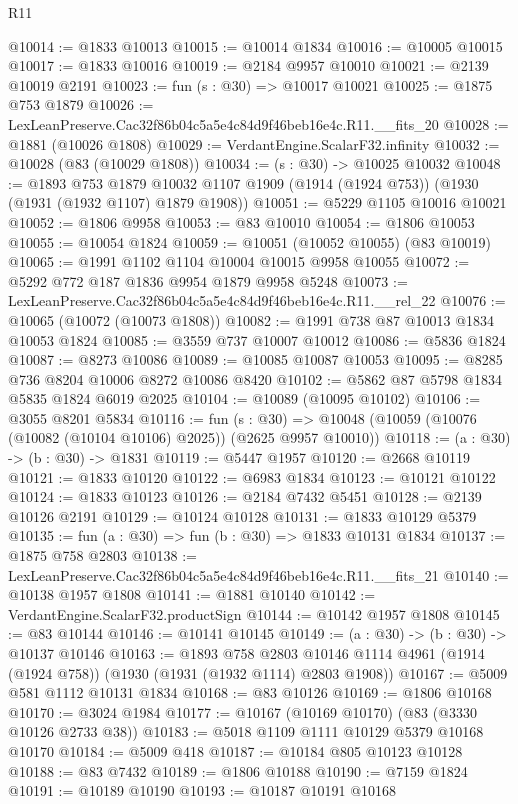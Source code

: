 \begin{lexlean}{R11}
\begin{coremodule}
@10014 := @1833 @10013
@10015 := @10014 @1834
@10016 := @10005 @10015
@10017 := @1833 @10016
@10019 := @2184 @9957 @10010
@10021 := @2139 @10019 @2191
@10023 := fun (s : @30) => @10017 @10021
@10025 := @1875 @753 @1879
@10026 := LexLeanPreserve.Cac32f86b04c5a5e4c84d9f46beb16e4c.R11.__fits_20
@10028 := @1881 (@10026 @1808)
@10029 := VerdantEngine.ScalarF32.infinity
@10032 := @10028 (@83 (@10029 @1808))
@10034 := (s : @30) -> @10025 @10032
@10048 := @1893
    @753
    @1879
    @10032
    @1107
    @1909
    (@1914 (@1924 @753))
    (@1930 (@1931 (@1932 @1107) @1879 @1908))
@10051 := @5229 @1105 @10016 @10021
@10052 := @1806 @9958
@10053 := @83 @10010
@10054 := @1806 @10053
@10055 := @10054 @1824
@10059 := @10051 (@10052 @10055) (@83 @10019)
@10065 := @1991 @1102 @1104 @10004 @10015 @9958 @10055
@10072 := @5292 @772 @187 @1836 @9954 @1879 @9958 @5248
@10073 := LexLeanPreserve.Cac32f86b04c5a5e4c84d9f46beb16e4c.R11.__rel_22
@10076 := @10065 (@10072 (@10073 @1808))
@10082 := @1991 @738 @87 @10013 @1834 @10053 @1824
@10085 := @3559 @737 @10007 @10012
@10086 := @5836 @1824
@10087 := @8273 @10086
@10089 := @10085 @10087 @10053
@10095 := @8285 @736 @8204 @10006 @8272 @10086 @8420
@10102 := @5862 @87 @5798 @1834 @5835 @1824 @6019 @2025
@10104 := @10089 (@10095 @10102)
@10106 := @3055 @8201 @5834
@10116 := fun (s : @30) =>
  @10048 (@10059 (@10076 (@10082 (@10104 @10106) @2025)) (@2625 @9957 @10010))
@10118 := (a : @30) -> (b : @30) -> @1831
@10119 := @5447 @1957
@10120 := @2668 @10119
@10121 := @1833 @10120
@10122 := @6983 @1834
@10123 := @10121 @10122
@10124 := @1833 @10123
@10126 := @2184 @7432 @5451
@10128 := @2139 @10126 @2191
@10129 := @10124 @10128
@10131 := @1833 @10129 @5379
@10135 := fun (a : @30) => fun (b : @30) => @1833 @10131 @1834
@10137 := @1875 @758 @2803
@10138 := LexLeanPreserve.Cac32f86b04c5a5e4c84d9f46beb16e4c.R11.__fits_21
@10140 := @10138 @1957 @1808
@10141 := @1881 @10140
@10142 := VerdantEngine.ScalarF32.productSign
@10144 := @10142 @1957 @1808
@10145 := @83 @10144
@10146 := @10141 @10145
@10149 := (a : @30) -> (b : @30) -> @10137 @10146
@10163 := @1893
    @758
    @2803
    @10146
    @1114
    @4961
    (@1914 (@1924 @758))
    (@1930 (@1931 (@1932 @1114) @2803 @1908))
@10167 := @5009 @581 @1112 @10131 @1834
@10168 := @83 @10126
@10169 := @1806 @10168
@10170 := @3024 @1984
@10177 := @10167 (@10169 @10170) (@83 (@3330 @10126 @2733 @38))
@10183 := @5018 @1109 @1111 @10129 @5379 @10168 @10170
@10184 := @5009 @418
@10187 := @10184 @805 @10123 @10128
@10188 := @83 @7432
@10189 := @1806 @10188
@10190 := @7159 @1824
@10191 := @10189 @10190
@10193 := @10187 @10191 @10168

\end{coremodule}
\end{lexlean}
